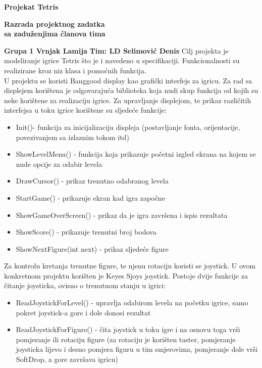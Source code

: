 \documentclass[a4paper,12pt,twoside]{article}
\begin{document}
\begin{center}
{\Huge \bf Projekat Tetris } \\
\vspace*{0.5cm}

{\Large \bf Razrada projektnog zadatka\\ sa zaduženjima članova tima} \\
\end{center}
{\large \bf Grupa 1 \hfill Vrnjak Lamija} \linebreak
{\large \bf Tim: LD \hfill Selimović Denis} \linebreak
\linebreak
Cilj projekta je modeliranje igrice Tetris što je i navedeno u specifikaciji. Funkcionalnosti su realizirane kroz niz klasa i pomoćnih funkcija. \\
U projektu se koristi Banggood display kao grafički interfejs za igricu. Za rad sa displejem korištena je odgovarajuća biblioteka koja nudi skup funkcija od kojih su neke korištene za realizaciju igrice. Za upravljanje displejom, te prikaz različitih interfejsa u toku igrice korištene su sljedeće funkcije:
\begin{itemize}
\item Init()- funkcija za inicijalizaciju displeja (postavljanje fonta, orijentacije, povezivanjem sa izlaznim tokom itd) \textbf{}
\item ShowLevelMenu() - funkcija koja prikazuje početni izgled ekrana na kojem se nude opcije za odabir levela \textbf{}
\item DrawCursor() - prikaz trenutno odabranog levela \textbf{}
\item StartGame() - prikazuje ekran kad igra započne \textbf{}
\item ShowGameOverScreen() - prikaz da je igra završena i ispis rezultata \textbf{}
\item ShowScore() - prikazuje trenutni broj bodova \textbf{}
\item ShowNextFigure(int next) - prikaz sljedeće figure \textbf{}
\end{itemize}
Za kontrolu kretanja trenutne figure, te njenu rotaciju koristi se joystick. U ovom konkretnom projektu korišten je Keyes Sjoys joystick. Postoje dvije funkcije za čitanje joysticka, ovisno o trenutnom stanju u igrici:
\begin{itemize}
\item ReadJoystickForLevel() - upravlja odabirom levela na početku igrice, samo pokret joystick-a gore i dole donosi rezultat \textbf{}
\item ReadJoystickForFigure() - čita joystick u toku igre i na osnovu toga vrši pomjeranje ili rotaciju figure (za rotaciju je korišten taster, pomjeranje joysticka lijevo i desno pomjera figuru u tim smjerovima, pomjeranje dole vrši SoftDrop, a gore završava igricu) \textbf{}
\end{itemize}
\end{document}
